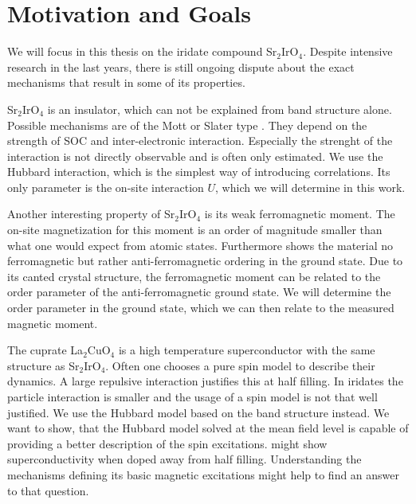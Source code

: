  






\section{Motivation and Goals}


We will focus in this thesis on the iridate compound Sr$_2$IrO$_4$. 
Despite intensive research in the last years, 
there is still ongoing dispute about the exact mechanisms that result in some of its properties.


Sr$_2$IrO$_4$ is an insulator, which can not be explained from band structure alone. 
Possible mechanisms are of the Mott or Slater type \cite{PhysRevB.89.165115}.
They depend on the strength of SOC and inter-electronic interaction.
Especially the strenght of the interaction is not directly observable and is often only estimated.
We use the Hubbard interaction, which is the simplest way of introducing correlations.
Its only parameter is the on-site interaction $U$, which we will determine in this work.


Another interesting property of Sr$_2$IrO$_4$ is its  weak ferromagnetic moment.
The on-site magnetization for this moment is an order of magnitude smaller than what one would expect from atomic states.
Furthermore shows the material no ferromagnetic but rather anti-ferromagnetic ordering in the ground state.
Due to its canted crystal structure, the ferromagnetic moment can be related to the order parameter of the anti-ferromagnetic ground state.
We will determine the order parameter in the ground state, which we can then relate to the measured magnetic moment.

The cuprate La$_2$CuO$_4$ is a high temperature superconductor with the same structure as Sr$_2$IrO$_4$. 
Often one chooses a pure spin model to describe their dynamics. 
A large repulsive interaction justifies this at half filling.
In iridates the particle interaction is smaller and the usage of a spin model is not that well justified.
We use the Hubbard model based on the band structure  instead. 
We want to show, that the Hubbard model solved at the mean field level is capable of providing a better description of the spin excitations.
\Sriro might show superconductivity when doped away from half filling. Understanding the mechanisms defining its basic magnetic excitations might help to find an answer to that question.






